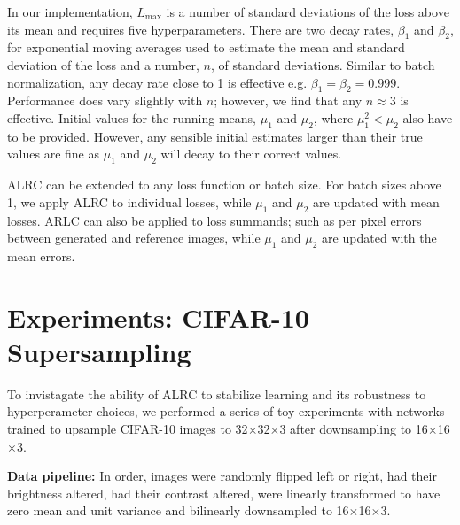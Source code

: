 \documentclass[letterpaper, 10 pt, conference]{ieeeconf}  %
\newcommand\extraspace{3pt}
\begin{document}
In our implementation, $L_\text{max}$ is a number of standard deviations of the loss above its mean and requires five hyperparameters. There are two decay rates, $\beta_1$ and $\beta_2$, for exponential moving averages used to estimate the mean and standard deviation of the loss and a number, $n$, of standard deviations. Similar to batch normalization\cite{ioffe2015batch}, any decay rate close to 1 is effective e.g. $\beta_1 = \beta_2 = 0.999$. Performance does vary slightly with $n$; however, we find that any $n \approx 3$ is effective. Initial values for the running means, $\mu_1$ and $\mu_2$, where $\mu_1^2 < \mu_2$ also have to be provided. However, any sensible initial estimates larger than their true values are fine as $\mu_1$ and $\mu_2$ will decay to their correct values.

ALRC can be extended to any loss function or batch size. For batch sizes above 1, we apply ALRC to individual losses, while $\mu_1$ and $\mu_2$ are updated with mean losses. ARLC can also be applied to loss summands; such as per pixel errors between generated and reference images, while $\mu_1$ and $\mu_2$ are updated with the mean errors.

\section{Experiments: CIFAR-10 Supersampling}

To invistagate the ability of ALRC to stabilize learning and its robustness to hyperperameter choices, we performed a series of toy experiments with networks trained to upsample CIFAR-10\cite{krizhevsky2014cifar, krizhevsky2009learning} images to 32$\times$32$\times$3 after downsampling to 16$\times$16$\times$3.

\vspace{\extraspace}
\noindent\textbf{Data pipeline:} In order, images were randomly flipped left or right, had their brightness altered, had their contrast altered, were linearly transformed to have zero mean and unit variance and bilinearly downsampled to 16$\times$16$\times$3.
\end{document}
